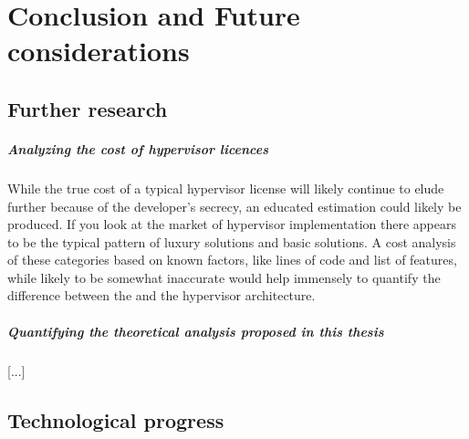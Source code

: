 
\chapter{Conclusion and Future considerations} %

\label{Chapter6} %


\newcommand{\keyword}[1]{\textbf{#1}}
\newcommand{\tabhead}[1]{\textbf{#1}}
\newcommand{\code}[1]{\texttt{#1}}
\newcommand{\file}[1]{\texttt{\bfseries#1}}
\newcommand{\option}[1]{\texttt{\itshape#1}}


\section{Further research}
\paragraph{Analyzing the cost of hypervisor licences}
While the true cost of a typical hypervisor license will likely continue to elude further because of the developer's secrecy, an educated estimation could likely be produced. If you look at the market of hypervisor implementation there appears to be the typical pattern of luxury solutions and basic solutions. A cost analysis of these categories based on known factors, like lines of code and list of features, while likely to be somewhat inaccurate would help immensely to quantify the difference between the  and the hypervisor architecture.
\paragraph{Quantifying the theoretical analysis proposed in this thesis}
[...]

\section{Technological progress} \label{tech-progress}
